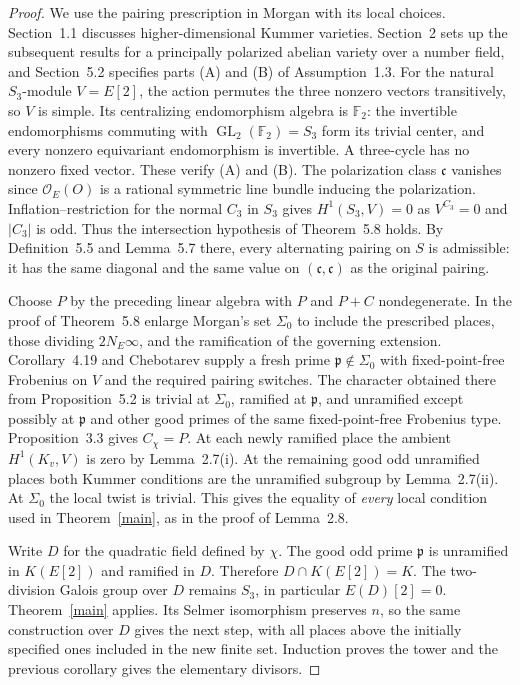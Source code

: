 \documentclass[11pt]{article}
\begin{document}
\begin{proof}
We use the pairing prescription in Morgan \cite[Thm.~5.8]{Morgan}
with its local choices. Section~1.1 discusses higher-dimensional
Kummer varieties. Section~2 sets up the subsequent results for a
principally polarized abelian variety over a number field, and
Section~5.2 specifies parts (A) and (B) of Assumption~1.3.
For the natural $S_3$-module $V=E[2]$, the action permutes the three
nonzero vectors transitively, so $V$ is simple. Its centralizing
endomorphism algebra is $\mathbb F_2$: the invertible endomorphisms
commuting with $\operatorname{GL}_2(\mathbb F_2)=S_3$ form its trivial
center, and every nonzero equivariant endomorphism is invertible.
A three-cycle has no nonzero fixed vector. These verify (A) and (B).
The polarization class $\mathfrak c$ vanishes since $\mathcal O_E(O)$
is a rational symmetric line bundle inducing the polarization.
Inflation--restriction for the normal $C_3$ in $S_3$ gives
$H^1(S_3,V)=0$ as $V^{C_3}=0$ and $|C_3|$ is odd.
Thus the intersection hypothesis of Theorem~5.8 holds. By
Definition~5.5 and Lemma~5.7 there, every alternating pairing on $S$
is admissible: it has the same diagonal and the same value on
$(\mathfrak c,\mathfrak c)$ as the original pairing.

Choose $P$ by the preceding linear algebra with $P$ and $P+C$
nondegenerate. In the proof of Theorem~5.8 enlarge Morgan's set
$\Sigma_0$ to include the prescribed places, those dividing
$2N_E\infty$, and the ramification of the governing extension.
Corollary~4.19 and Chebotarev supply a fresh prime
$\mathfrak p\notin\Sigma_0$ with fixed-point-free Frobenius on $V$
and the required pairing switches. The character obtained there
from Proposition~5.2 is trivial at $\Sigma_0$, ramified at
$\mathfrak p$, and unramified except possibly at $\mathfrak p$ and
other good primes of the same fixed-point-free Frobenius type.
Proposition~3.3 gives $C_\chi=P$. At each newly ramified place
the ambient $H^1(K_v,V)$ is zero by Lemma~2.7(i).
At the remaining good odd unramified places both Kummer conditions
are the unramified subgroup by Lemma~2.7(ii). At $\Sigma_0$ the local
twist is trivial. This gives the equality of \emph{every} local
condition used in Theorem~\ref{main}, as in the proof of Lemma~2.8.

Write $D$ for the quadratic field defined by $\chi$. The good odd
prime $\mathfrak p$ is unramified in $K(E[2])$ and ramified in $D$.
Therefore $D\cap K(E[2])=K$. The two-division Galois group over $D$
remains $S_3$, in particular $E(D)[2]=0$. Theorem~\ref{main} applies.
Its Selmer isomorphism preserves $n$, so the same construction over
$D$ gives the next step, with all places above the initially specified
ones included in the new finite set. Induction proves the tower and
the previous corollary gives the elementary divisors.
\end{proof}
\end{document}
